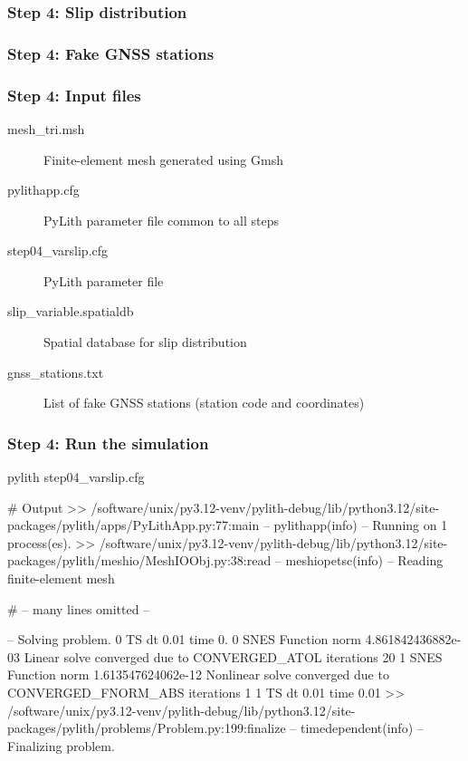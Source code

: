 \documentclass[aspectratio=169]{beamer}
\begin{document}
\begin{frame}
  \frametitle{Step 4: Slip distribution}
  \summary{}

    
\end{frame}


\begin{frame}
  \frametitle{Step 4: Fake GNSS stations}

    
\end{frame}


\begin{frame}
  \frametitle{Step 4: Input files}
  \summary{}

  \begin{description}
  \item[mesh\_tri.msh] Finite-element mesh generated using Gmsh
  \item[pylithapp.cfg] PyLith parameter file common to all steps
  \item[step04\_varslip.cfg] PyLith parameter file
  \item[slip\_variable.spatialdb] Spatial database for slip distribution
  \item[gnss\_stations.txt] List of fake GNSS stations (station code and coordinates)
  \end{description}
    
\end{frame}


\begin{frame}[fragile]
  \frametitle{Step 4: Run the simulation}
  \summary{}

\begin{bashcode}
pylith step04_varslip.cfg

# Output
 >> /software/unix/py3.12-venv/pylith-debug/lib/python3.12/site-packages/pylith/apps/PyLithApp.py:77:main
 -- pylithapp(info)
 -- Running on 1 process(es).
 >> /software/unix/py3.12-venv/pylith-debug/lib/python3.12/site-packages/pylith/meshio/MeshIOObj.py:38:read
 -- meshiopetsc(info)
 -- Reading finite-element mesh

# -- many lines omitted --

 -- Solving problem.
0 TS dt 0.01 time 0.
    0 SNES Function norm 4.861842436882e-03
      Linear solve converged due to CONVERGED_ATOL iterations 20
    1 SNES Function norm 1.613547624062e-12
    Nonlinear solve converged due to CONVERGED_FNORM_ABS iterations 1
1 TS dt 0.01 time 0.01
 >> /software/unix/py3.12-venv/pylith-debug/lib/python3.12/site-packages/pylith/problems/Problem.py:199:finalize
 -- timedependent(info)
 -- Finalizing problem.
\end{bashcode}
  
\end{frame}
\end{document}
